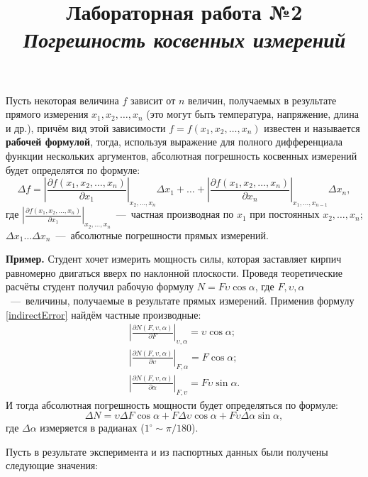\documentclass[14pt,a4paper]{article}
\title{Лабораторная работа №2 \\ \textit{Погрешность косвенных измерений}}
\begin{document}
\maketitle
Пусть некоторая величина $f$ зависит от $n$ величин, получаемых в результате прямого измерения  $x_1, x_2, \ldots, x_n$ (это могут быть температура, напряжение, длина и др.), причём вид этой зависимости $f = f(x_1, x_2, \ldots, x_n)$ известен и называется \textbf{рабочей формулой}, тогда, используя выражение для полного дифференциала функции нескольких аргументов, абсолютная погрешность косвенных измерений будет определятся по формуле:
\begin{equation} \label{indirectError}
    \Delta f = \left | \frac{\partial f(x_1, x_2, \ldots, x_n)}{\partial x_1} \right |_{x_2, \ldots, x_n} \Delta x_1 + \ldots + \left | \frac{\partial f(x_1, x_2, \ldots, x_n)}{\partial x_n} \right |_{x_1, \ldots, x_{n-1}} \Delta x_n,
\end{equation}
где $\left | \frac{\partial f(x_1, x_2, \ldots, x_n)}{\partial x_1} \right |_{x_2, \ldots, x_n}$~---~частная производная по $x_1$ при постоянных $x_2, \ldots, x_n$; $\Delta x_1 \ldots \Delta x_n$~---~абсолютные погрешности прямых измерений.

\textbf{Пример.}
Студент хочет измерить мощность силы, которая заставляет кирпич равномерно двигаться вверх по наклонной плоскости. Проведя теоретические расчёты студент получил рабочую формулу $N = F\upsilon\cos{\alpha}$, где $F, \upsilon, \alpha$~---~величины, получаемые в результате прямых измерений. Применив формулу \ref{indirectError} найдём частные производные:
\begin{gather*}
    \left | \frac{\partial N(F, \upsilon, \alpha)}{\partial F} \right |_{\upsilon, \alpha} = \upsilon\cos{\alpha} ; \\
    \left | \frac{\partial N(F, \upsilon, \alpha)}{\partial \upsilon} \right |_{F, \alpha} = F\cos{\alpha} ; \\
    \left | \frac{\partial N(F, \upsilon, \alpha)}{\partial \alpha} \right |_{F, \upsilon} = F\upsilon\sin{\alpha}.
\end{gather*}
И тогда абсолютная погрешность мощности будет определяться по формуле:
\begin{equation*}
    \Delta N = \upsilon\Delta F\cos{\alpha} + F\Delta \upsilon\cos{\alpha} + F\upsilon\Delta\alpha\sin{\alpha},
\end{equation*}
где $\Delta\alpha$ измеряется в радианах ($1^\circ \sim \pi/180$). 

Пусть в результате эксперимента и из паспортных данных были получены следующие значения:
\end{document}
